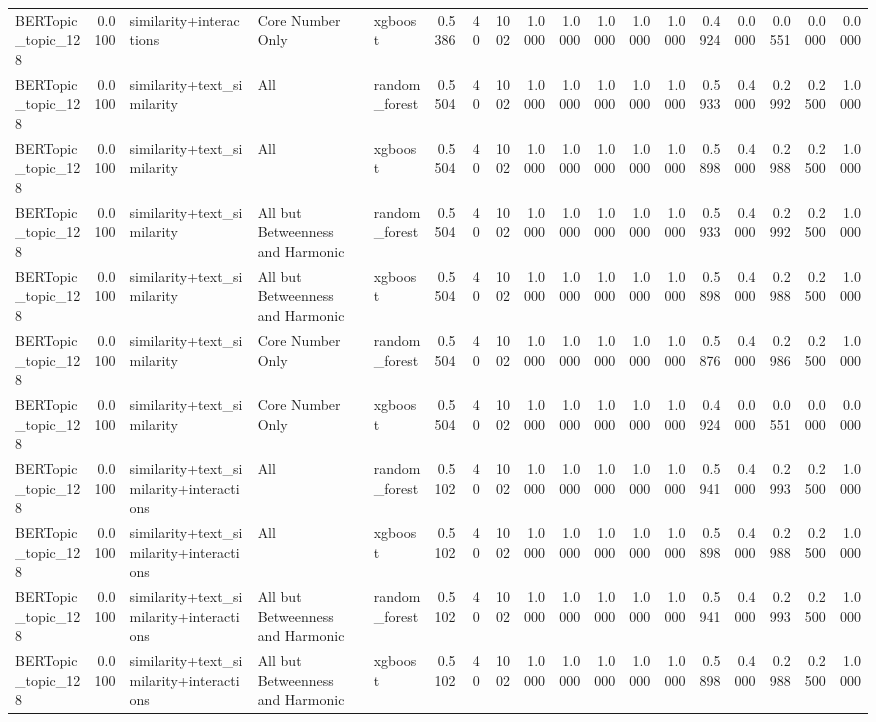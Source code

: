 \begin{tabular}{lrlllrrrrrrrrrrrrr}
BERTopic_topic_128 & 0.0100 & similarity+interactions & Core Number Only & xgboost & 0.5386 & 40 & 1002 & 1.0000 & 1.0000 & 1.0000 & 1.0000 & 1.0000 & 0.4924 & 0.0000 & 0.0551 & 0.0000 & 0.0000 \\
BERTopic_topic_128 & 0.0100 & similarity+text_similarity & All & random_forest & 0.5504 & 40 & 1002 & 1.0000 & 1.0000 & 1.0000 & 1.0000 & 1.0000 & 0.5933 & 0.4000 & 0.2992 & 0.2500 & 1.0000 \\
BERTopic_topic_128 & 0.0100 & similarity+text_similarity & All & xgboost & 0.5504 & 40 & 1002 & 1.0000 & 1.0000 & 1.0000 & 1.0000 & 1.0000 & 0.5898 & 0.4000 & 0.2988 & 0.2500 & 1.0000 \\
BERTopic_topic_128 & 0.0100 & similarity+text_similarity & All but Betweenness and Harmonic & random_forest & 0.5504 & 40 & 1002 & 1.0000 & 1.0000 & 1.0000 & 1.0000 & 1.0000 & 0.5933 & 0.4000 & 0.2992 & 0.2500 & 1.0000 \\
BERTopic_topic_128 & 0.0100 & similarity+text_similarity & All but Betweenness and Harmonic & xgboost & 0.5504 & 40 & 1002 & 1.0000 & 1.0000 & 1.0000 & 1.0000 & 1.0000 & 0.5898 & 0.4000 & 0.2988 & 0.2500 & 1.0000 \\
BERTopic_topic_128 & 0.0100 & similarity+text_similarity & Core Number Only & random_forest & 0.5504 & 40 & 1002 & 1.0000 & 1.0000 & 1.0000 & 1.0000 & 1.0000 & 0.5876 & 0.4000 & 0.2986 & 0.2500 & 1.0000 \\
BERTopic_topic_128 & 0.0100 & similarity+text_similarity & Core Number Only & xgboost & 0.5504 & 40 & 1002 & 1.0000 & 1.0000 & 1.0000 & 1.0000 & 1.0000 & 0.4924 & 0.0000 & 0.0551 & 0.0000 & 0.0000 \\
BERTopic_topic_128 & 0.0100 & similarity+text_similarity+interactions & All & random_forest & 0.5102 & 40 & 1002 & 1.0000 & 1.0000 & 1.0000 & 1.0000 & 1.0000 & 0.5941 & 0.4000 & 0.2993 & 0.2500 & 1.0000 \\
BERTopic_topic_128 & 0.0100 & similarity+text_similarity+interactions & All & xgboost & 0.5102 & 40 & 1002 & 1.0000 & 1.0000 & 1.0000 & 1.0000 & 1.0000 & 0.5898 & 0.4000 & 0.2988 & 0.2500 & 1.0000 \\
BERTopic_topic_128 & 0.0100 & similarity+text_similarity+interactions & All but Betweenness and Harmonic & random_forest & 0.5102 & 40 & 1002 & 1.0000 & 1.0000 & 1.0000 & 1.0000 & 1.0000 & 0.5941 & 0.4000 & 0.2993 & 0.2500 & 1.0000 \\
BERTopic_topic_128 & 0.0100 & similarity+text_similarity+interactions & All but Betweenness and Harmonic & xgboost & 0.5102 & 40 & 1002 & 1.0000 & 1.0000 & 1.0000 & 1.0000 & 1.0000 & 0.5898 & 0.4000 & 0.2988 & 0.2500 & 1.0000 \\

\end{tabular}
